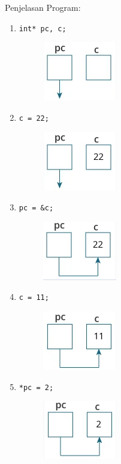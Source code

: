 Penjelasan Program:\\
\begin{enumerate}
    \item \verb|int* pc, c;|
    \begin{figure}[H]
        \centering
        \includegraphics[width=0.2\linewidth]{../P4/img/screenshot001.png}
        \caption{}
        \label{fig:satu}
    \end{figure}
    \item \verb|c = 22;|
    \begin{figure}[H]
        \centering
        \includegraphics[width=0.2\linewidth]{../P4/img/screenshot002.png}
        \caption{}
        \label{fig:dua}
    \end{figure}
    \item \verb|pc = &c;|
    \begin{figure}[H]
        \centering
        \includegraphics[width=0.2\linewidth]{../P4/img/screenshot003.png}
        \caption{}
        \label{fig:tiga}
    \end{figure}
    \item \verb|c = 11;|
    \begin{figure}[H]
        \centering
        \includegraphics[width=0.2\linewidth]{../P4/img/screenshot004.png}
        \caption{}
        \label{fig:empat}
    \end{figure}
    \item \verb|*pc = 2;|
    \begin{figure}[H]
        \centering
        \includegraphics[width=0.2\linewidth]{../P4/img/screenshot005.png}
        \caption{}
        \label{fig:lima}
    \end{figure}
\end{enumerate}

